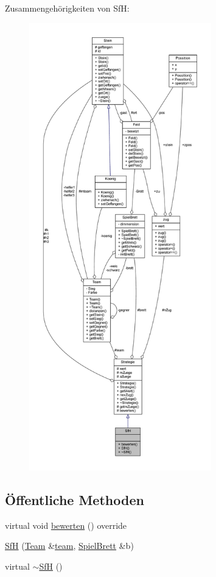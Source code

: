 Zusammengehörigkeiten von Sf\+H\+:\nopagebreak
\begin{figure}[H]
\begin{center}
\leavevmode
\includegraphics[height=550pt]{class_sf_h__coll__graph}
\end{center}
\end{figure}
\subsection*{Öffentliche Methoden}
\begin{DoxyCompactItemize}
\item 
virtual void \hyperlink{class_sf_h_a9790a3fab6619e16961568d735678d4f}{bewerten} () override
\item 
\hyperlink{class_sf_h_a97daf9dffa4529ca2ed4ce98ac9d0e67}{Sf\+H} (\hyperlink{class_team}{Team} \&\hyperlink{class_strategie_a4f55e74f189ec8c6df88a57119fb3def}{team}, \hyperlink{class_spiel_brett}{Spiel\+Brett} \&b)
\item 
virtual \hyperlink{class_sf_h_a320c8f54cfd3a4ab7759a4c76cf08877}{$\sim$\+Sf\+H} ()
\end{DoxyCompactItemize}
